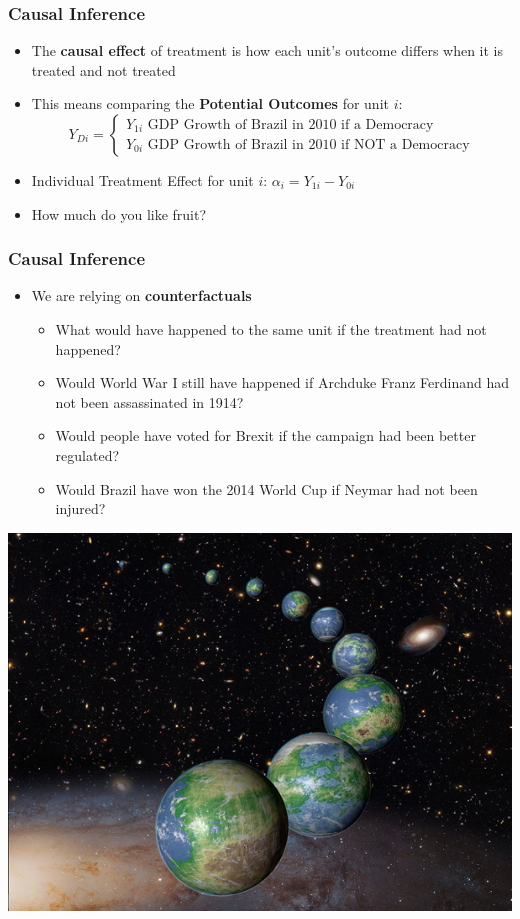\documentclass[xcolor=x11names,compress]{beamer}\usepackage[]{graphicx}\usepackage[]{xcolor}
\renewcommand{\(}{\begin{columns}}
\renewcommand{\)}{\end{columns}}
\newcommand{\<}[1]{\begin{column}{#1}}
\renewcommand{\>}{\end{column}}
\begin{document}
\begin{frame}
\frametitle{Causal Inference}
\begin{itemize}
\item The \textbf{causal effect} of treatment is how each unit's outcome differs when it is treated and not treated
\item This means comparing the \textbf{Potential Outcomes} for unit $i$:
\[
Y_{Di} = 
\begin{cases}
Y_{1i}\text{   GDP Growth of Brazil in 2010 if a Democracy} \\
Y_{0i}\text{   GDP Growth of Brazil in 2010 if NOT a Democracy}
\end{cases}
\]
\item Individual Treatment Effect for unit $i$: $\alpha_i = Y_{1i} - Y_{0i}$
\pause
\item How much do you like fruit?
\end{itemize}
\end{frame}

\begin{frame}
\frametitle{Causal Inference}
\begin{itemize}
\item We are relying on \textbf{counterfactuals}
\pause
\begin{itemize}
\item What would have happened to the same unit if the treatment had not happened?
\pause
\item Would World War I still have happened if Archduke Franz Ferdinand had not been assassinated in 1914?
\pause
\item Would people have voted for Brexit if the campaign had been better regulated? 
\pause
\item Would Brazil have won the 2014 World Cup if Neymar had not been injured?
\pause
\end{itemize}
\end{itemize}
\end{frame}

\includegraphics[width=1\textwidth]{figure/Multiverse.png}
\end{document}

